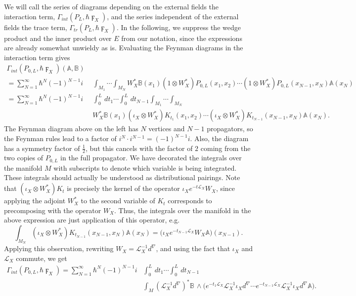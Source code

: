 \documentclass[reqno]{amsart}
\theoremstyle{definition}
\theoremstyle{remark}
\newcommand{\A}{\mathbb{A}}
\newcommand{\B}{\mathbb{B}}
\renewcommand{\d}{d^\nabla}
\newcommand{\h}{\hbar}
\renewcommand{\L}{\mathcal{L}}
\begin{document}
We will call the series of diagrams depending on the external fields the interaction term, $\Gamma_{int}(P_L,\h \digamma_X)$, and the series independent of the external fields the trace term, $\Gamma_{tr}(P_L,\h \digamma_X)$. In the following, we suppress the wedge product and the inner product over $E$ from our notation, since the expressions are already somewhat unwieldy as is. 
Evaluating the Feynman diagrams in the interaction term gives
\begin{equation}
\label{interaction1}
\begin{split}
    \Gamma_{int}(P_{0,L},\hbar \digamma_X)(\A,\B)\,\,& \\
    =\sum_{N=1}^\infty \hbar^N(-1)^{N-1}i &\int_{M_1}\cdots\int_{M_N}
    W_X^*\B(x_1)(1\otimes W_X^*)P_{0,L}(x_1,x_2)\cdots(1\otimes W_X^*)P_{0,L}(x_{N-1},x_N)\A(x_N) \\
    = \sum_{N=1}^\infty \hbar^N(-1)^{N-1}i &\int_0^L\,dt_1\cdots\int_0^L\,dt_{N-1} \int_{M_1}\cdots\int_{M_N} \\
    &W_X^*\B(x_1)(\iota_X\otimes W_X^*)K_{t_1}(x_1,x_2)\cdots(\iota_X\otimes W_X^*)K_{t_{N-1}}(x_{N-1},x_N)\A(x_N).
\end{split}
\end{equation}
The Feynman diagram above on the left has $N$ vertices and $N-1$ propagators, so the Feynman rules lead to a factor of $i^N\cdot i^{N-1} = (-1)^{N-1}i$. Also, the diagram has a symmetry factor of $\frac{1}{2}$, but this cancels with the factor of $2$ coming from the two copies of $P_{0,L}$ in the full propagator. We have decorated the integrals over the manifold $M$ with subscripts to denote which variable is being integrated. These integrals should actually be understood as distributional pairings.
Note that $(\iota_X\otimes W_X^*)K_t$ is precisely the kernel of the operator $\iota_X e^{-t\L_X} W_X$, since applying the adjoint $W_X^*$ to the second variable of $K_t$ corresponds to precomposing with the operator $W_X$. Thus, the integrals over the manifold in the above expression are just application of this operator, e.g.
$$\int_{M_N} (\iota_X\otimes W_X^*)K_{t_{N-1}}(x_{N-1},x_N)\A(x_N) = \big(\iota_X e^{-t_{N-1}\L_X} W_X\A \big)(x_{N-1}).$$
Applying this observation, rewriting $W_X=\L_X^{-1}\d$, and using the fact that $\iota_X$ and $\L_X$ commute, we get
\begin{equation}
\begin{split}
\label{interaction}
    \Gamma_{int}(P_{0,L},\h \digamma_X) =
    \sum_{N=1}^\infty \hbar^N(-1)^{N-1}i &\int_0^L\,dt_1\cdots\int_0^L\,dt_{N-1} \\
    &\int_M (\L_X^{-1}\d)^*\B\,\wedge\big( e^{-t_1\L_X} \L_X^{-1}\iota_X\d \cdots e^{-t_{N-1}\L_X} \L_X^{-1}\iota_X\d \A\big).
\end{split}
\end{equation}
\end{document}
